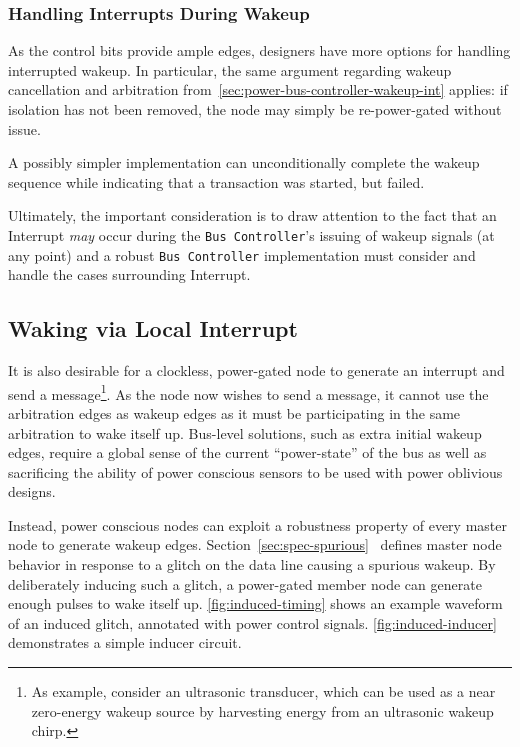 \subsubsection{Handling Interrupts During Wakeup}
As the control bits provide ample edges, designers have more options for
handling interrupted wakeup. In particular, the same argument regarding wakeup
cancellation and arbitration from~\ref{sec:power-bus-controller-wakeup-int}
applies: if isolation has not been removed, the node may simply be
re-power-gated without issue.

A possibly simpler implementation can unconditionally complete the wakeup
sequence while indicating that a transaction was started, but failed.

Ultimately, the important consideration is to draw attention to the fact that
an Interrupt {\em may} occur during the {\tt Bus~Controller}'s issuing of
wakeup signals (at any point) and a robust {\tt Bus~Controller} implementation
must consider and handle the cases surrounding Interrupt.

\subsection{Waking via Local Interrupt}
It is also desirable for a clockless, power-gated \bus node to generate an
interrupt and send a message\footnote{
  As example, consider an ultrasonic transducer, which can be used as a near
  zero-energy wakeup source by harvesting energy from an ultrasonic wakeup
  chirp.}.
As the node now wishes to send a message, it cannot use the arbitration edges
as wakeup edges as it must be participating in the same arbitration to wake
itself up. Bus-level solutions, such as extra initial wakeup edges, require a
global sense of the current ``power-state'' of the bus as well as sacrificing
the ability of power conscious sensors to be used with power oblivious
designs.

Instead, power conscious nodes can exploit a robustness property of every \bus
master node to generate wakeup edges.
Section~\ref{sec:spec-spurious}~ defines master
node behavior in response to a glitch on the data line causing a spurious
wakeup. By deliberately inducing such a glitch, a power-gated member node can
generate enough pulses to wake itself up. \autoref{fig:induced-timing}
shows an example waveform of an induced glitch, annotated with power control
signals. \autoref{fig:induced-inducer} demonstrates a simple inducer
circuit.

